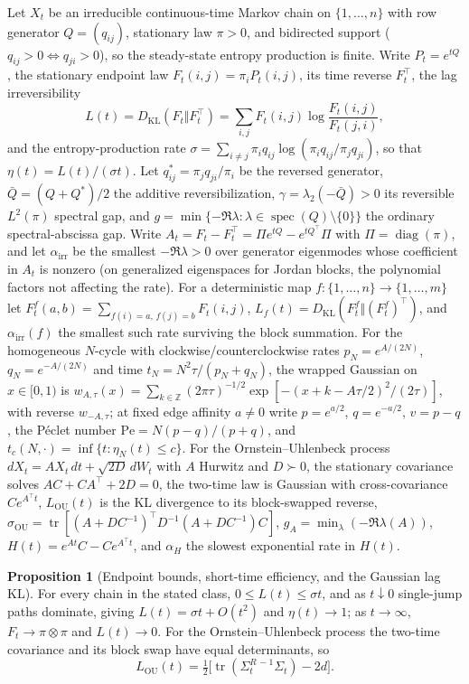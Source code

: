 \documentclass[11pt]{article}
\theoremstyle{definition}
\newcommand{\Z}{\mathbb Z}
\providecommand{\Z}{\mathbb Z}
\newtheorem{proposition}{Proposition}
\begin{document}
Let $X_t$ be an irreducible continuous-time Markov chain on $\{1,\ldots,n\}$ with row generator $Q=(q_{ij})$, stationary law $\pi>0$, and bidirected support ($q_{ij}>0\Leftrightarrow q_{ji}>0$), so the steady-state entropy production is finite.  Write $P_t=e^{tQ}$, the stationary endpoint law $F_t(i,j)=\pi_iP_t(i,j)$, its time reverse $F_t^\top$, the lag irreversibility
\[
L(t)=D_{\mathrm{KL}}(F_t\Vert F_t^\top)=\sum_{i,j}F_t(i,j)\log\frac{F_t(i,j)}{F_t(j,i)},
\]
and the entropy-production rate $\sigma=\sum_{i\neq j}\pi_iq_{ij}\log(\pi_iq_{ij}/\pi_jq_{ji})$, so that $\eta(t)=L(t)/(\sigma t)$.  Let $q^*_{ij}=\pi_jq_{ji}/\pi_i$ be the reversed generator, $\bar Q=(Q+Q^*)/2$ the additive reversibilization, $\gamma=\lambda_2(-\bar Q)>0$ its reversible $L^2(\pi)$ spectral gap, and $g=\min\{-\Re\lambda:\lambda\in\operatorname{spec}(Q)\setminus\{0\}\}$ the ordinary spectral-abscissa gap.  Write $A_t=F_t-F_t^\top=\Pi e^{tQ}-e^{tQ^\top}\Pi$ with $\Pi=\operatorname{diag}(\pi)$, and let $\alpha_{\mathrm{irr}}$ be the smallest $-\Re\lambda>0$ over generator eigenmodes whose coefficient in $A_t$ is nonzero (on generalized eigenspaces for Jordan blocks, the polynomial factors not affecting the rate).  For a deterministic map $f:\{1,\ldots,n\}\to\{1,\ldots,m\}$ let $F_t^f(a,b)=\sum_{f(i)=a,\,f(j)=b}F_t(i,j)$, $L_f(t)=D_{\mathrm{KL}}(F_t^f\Vert(F_t^f)^\top)$, and $\alpha_{\mathrm{irr}}(f)$ the smallest such rate surviving the block summation.  For the homogeneous $N$-cycle with clockwise/counterclockwise rates $p_N=e^{A/(2N)}$, $q_N=e^{-A/(2N)}$ and time $t_N=N^2\tau/(p_N+q_N)$, the wrapped Gaussian on $x\in[0,1)$ is $w_{A,\tau}(x)=\sum_{k\in\Z}(2\pi\tau)^{-1/2}\exp[-(x+k-A\tau/2)^2/(2\tau)]$, with reverse $w_{-A,\tau}$; at fixed edge affinity $a\neq0$ write $p=e^{a/2}$, $q=e^{-a/2}$, $v=p-q$, the P\'eclet number $\mathrm{Pe}=N(p-q)/(p+q)$, and $t_c(N,\cdot)=\inf\{t:\eta_N(t)\le c\}$.  For the Ornstein--Uhlenbeck process $dX_t=AX_t\,dt+\sqrt{2D}\,dW_t$ with $A$ Hurwitz and $D\succ0$, the stationary covariance solves $AC+CA^\top+2D=0$, the two-time law is Gaussian with cross-covariance $Ce^{A^\top t}$, $L_{\mathrm{OU}}(t)$ is the KL divergence to its block-swapped reverse, $\sigma_{\mathrm{OU}}=\operatorname{tr}[(A+DC^{-1})^\top D^{-1}(A+DC^{-1})C]$, $g_A=\min_\lambda(-\Re\lambda(A))$, $H(t)=e^{At}C-Ce^{A^\top t}$, and $\alpha_H$ the slowest exponential rate in $H(t)$.

\begin{proposition}[Endpoint bounds, short-time efficiency, and the Gaussian lag KL]\label{aj:basic}
For every chain in the stated class, $0\le L(t)\le\sigma t$, and as $t\downarrow0$ single-jump paths dominate, giving $L(t)=\sigma t+O(t^2)$ and $\eta(t)\to1$; as $t\to\infty$, $F_t\to\pi\otimes\pi$ and $L(t)\to0$.  For the Ornstein--Uhlenbeck process the two-time covariance and its block swap have equal determinants, so
\[
L_{\mathrm{OU}}(t)=\tfrac12\bigl[\operatorname{tr}(\Sigma_t^{R\,-1}\Sigma_t)-2d\bigr].
\]
\end{proposition}
\end{document}
